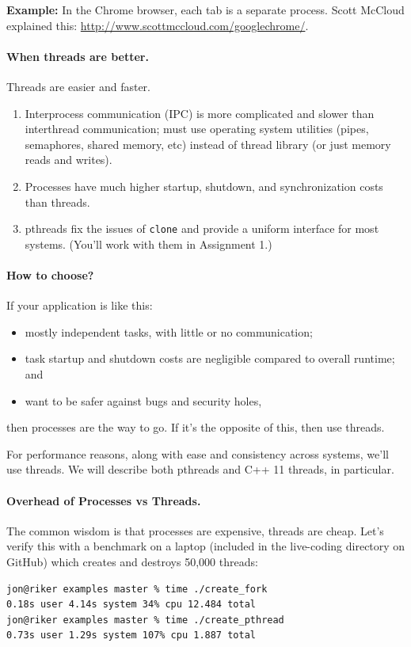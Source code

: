 \documentclass[a4paper]{report}
\begin{document}
{\bf Example:} In the Chrome browser, each tab is a separate
process. Scott McCloud explained this:
\url{http://www.scottmccloud.com/googlechrome/}.

\paragraph{When threads are better.} Threads are easier and faster.

  \begin{enumerate}
    \item Interprocess communication (IPC) is more complicated and slower than interthread
          communication; must use operating system utilities (pipes, semaphores, shared
              memory, etc) instead of thread library (or just memory reads and writes).
    \item Processes have much higher startup, shutdown, and synchronization costs than threads.
    \item pthreads fix the issues of {\tt clone} and provide a
          uniform interface for most systems. (You'll work with them in Assignment 1.)
  \end{enumerate}

\paragraph{How to choose?}
  If your application is like this:
  \begin{itemize}
    \item mostly independent tasks, with little or no communication;
    \item task startup and shutdown costs are negligible compared to overall runtime; and
    \item want to be safer against bugs and security holes,
  \end{itemize}
then processes are the way to go. If it's the opposite of this, then use threads.

For performance reasons, along with ease and consistency across systems, we'll use threads. We will describe both pthreads and C++ 11 threads, in particular.

\paragraph{Overhead of Processes vs Threads.} The common wisdom is that processes are
expensive, threads are cheap. Let's verify this with a benchmark on a
laptop (included in the live-coding directory on GitHub) which creates and destroys 50,000 threads:
  \begin{lstlisting}[basicstyle=\scriptsize]
jon@riker examples master % time ./create_fork 
0.18s user 4.14s system 34% cpu 12.484 total
jon@riker examples master % time ./create_pthread 
0.73s user 1.29s system 107% cpu 1.887 total
  \end{lstlisting}
\end{document}
